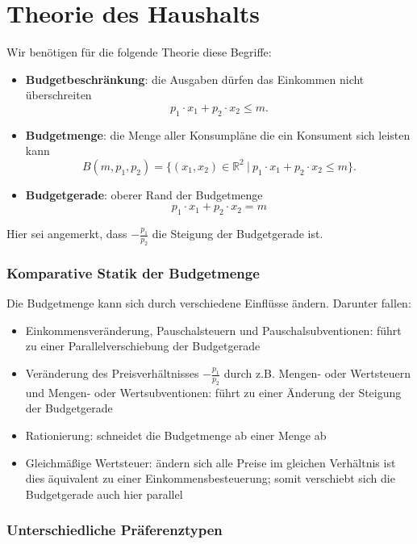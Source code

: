\section{Theorie des Haushalts}

 Wir benötigen für die folgende Theorie diese Begriffe:

\begin{itemize}
	\item \textbf{Budgetbeschränkung}: die Ausgaben dürfen das Einkommen nicht überschreiten 
		$$ p_1 \cdot x_1 + p_2 \cdot x_2 \leq m. $$
	\item \textbf{Budgetmenge}: die Menge aller Konsumpläne die ein Konsument sich leisten kann 
		$$ B(m, p_1, p_2) = \big\{ (x_1, x_2) \in \mathbb{R}^2 ~|~p_1 \cdot x_1 + p_2 \cdot x_2 \leq m \big\}. $$
	\item \textbf{Budgetgerade}: oberer Rand der Budgetmenge
		$$ p_1 \cdot x_1 + p_2 \cdot x_2 = m $$ 
\end{itemize}

Hier sei angemerkt, dass $- \frac{p_1}{p_2}$ die Steigung der Budgetgerade ist. ~\bigskip

\subsubsection*{Komparative Statik der Budgetmenge}

Die Budgetmenge kann sich durch verschiedene Einflüsse ändern. Darunter fallen:
\begin{itemize}
	\item Einkommensveränderung, Pauschalsteuern und Pauschalsubventionen: führt zu einer Parallelverschiebung der Budgetgerade
	\item Veränderung des Preisverhältnisses $- \frac{p_1}{p_2}$ durch z.B. Mengen- oder Wertsteuern und Mengen- oder Wertsubventionen: führt zu einer Änderung der Steigung der Budgetgerade
	\item Rationierung: schneidet die Budgetmenge ab einer Menge ab
	\item Gleichmäßige Wertsteuer: ändern sich alle Preise im gleichen Verhältnis ist dies äquivalent zu einer Einkommensbesteuerung; somit verschiebt sich die Budgetgerade auch hier parallel
\end{itemize} 


\subsubsection*{Unterschiedliche Präferenztypen}

